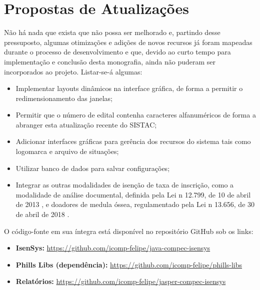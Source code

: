 \documentclass[
	12pt,			%
	openright,		%
	oneside,	
	a4paper,		%
	english,		%
	brazil			%
]{abntex2/abntex2}  %
\begin{document}
		\section{Propostas de Atualizações}
		
			Não há nada que exista que não possa ser melhorado e, partindo desse pressuposto, algumas otimizações e adições de novos recursos já foram mapeadas durante o processo de desenvolvimento e que, devido ao curto tempo para implementação e conclusão desta monografia, ainda não puderam ser incorporados ao projeto. Listar-se-á algumas:
			
			\begin{itemize}
				
				\item Implementar layouts dinâmicos na interface gráfica, de forma a permitir o redimensionamento das janelas;
				\item Permitir que o número de edital contenha caracteres alfanuméricos de forma a abranger esta atualização recente do SISTAC;
				\item Adicionar interfaces gráficas para gerência dos recursos do sistema tais como logomarca e arquivo de situações;
				\item Utilizar banco de dados para salvar configurações;
				\item Integrar as outras modalidades de isenção de taxa de inscrição, como a modalidade de análise documental, definida pela Lei n{\textdegree} 12.799, de 10 de abril de 2013 \cite{lei-12799}, e doadores de medula óssea, regulamentado pela Lei n{\textdegree} 13.656, de 30 de abril de 2018 \cite{lei-13656}.
				
			\end{itemize}
			
			O código-fonte em sua íntegra está disponível no repositório GitHub sob os links:
			
			\begin{itemize}
				
				\item \textbf{IsenSys:} \url{https://github.com/icomp-felipe/java-compec-isensys}
				\item \textbf{Phills Libs (dependência):} \url{https://github.com/icomp-felipe/phills-libs}
				\item \textbf{Relatórios:} \url{https://github.com/icomp-felipe/jasper-compec-isensys}
				
			\end{itemize}

	\postextual

	
\end{document}
